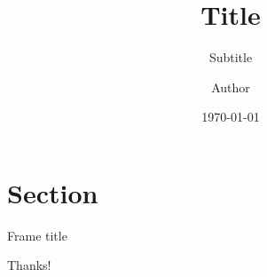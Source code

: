 \documentclass[aspectratio=169,11pt]{beamer}
\title{Title}
\subtitle{Subtitle}
\author{Author}
\institute{Institute}
\date{\today}
\begin{document}
\begin{frame}[plain]
  \titlepage
\end{frame}

\begin{frame}[plain]
  \tableofcontents
\end{frame}

\section{Section}

\begin{frame}{Frame title}
\end{frame}

\begin{frame}[standout]
  Thanks!
\end{frame}

\appendix
\end{document}
